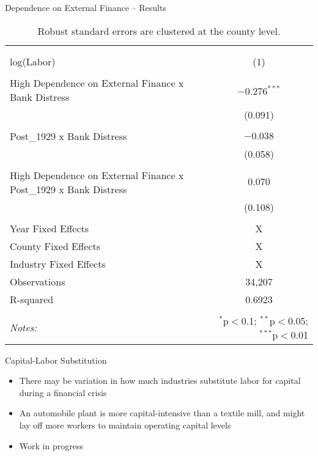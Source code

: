 \documentclass[11pt]{beamer}
\begin{document}
\begin{frame}{Dependence on External Finance -- Results}
\begin{table}  \tiny{
\begin{tabular}{lc} 
\\[-1.8ex]\hline  
 \hline \\[-1.8ex] 
 \\[-1.8ex] log(Labor) & \multicolumn{1}{c}{(1)} \\
 \hline \\[-1.8ex]                                                                             
 High Dependence on External Finance x Bank Distress & $-0.276^{***}$ \\ 
           & (0.091) \\ 
  & \\ 
 Post\_1929 x Bank Distress & $-0.038$ \\ 
  & (0.058) \\ 
  & \\ 
 High Dependence on External Finance x Post\_1929 x Bank Distress & $0.070$ \\ 
  & (0.108) \\ 
\hline \\[-1.8ex] 
Year Fixed Effects & \multicolumn{1}{c}{X} \\ 
County Fixed Effects  & \multicolumn{1}{c}{X} \\ 
Industry Fixed Effects &  \multicolumn{1}{c}{X} \\
Observations & \multicolumn{1}{c}{34,207}  \\
R-squared  &   \multicolumn{1}{c}{0.6923}  \\
\hline 
\hline \\[-1.8ex] 
\textit{Notes:}  & \multicolumn{1}{r}{$^{*}$p$<$0.1; $^{**}$p$<$0.05; $^{***}$p$<$0.01} \\ 
\end{tabular}
}
\caption{\tiny{Robust standard errors are clustered at the county level.}}
\end{table}
\end{frame}

\begin{frame}{Capital-Labor Substitution}
\begin{itemize}
\item There may be variation in how much industries substitute labor for capital during a financial crisis
\item An automobile plant is more capital-intensive than a textile mill, and might lay off more workers to maintain operating capital levels
\item Work in progress
\end{itemize}
\end{frame}
\end{document}
